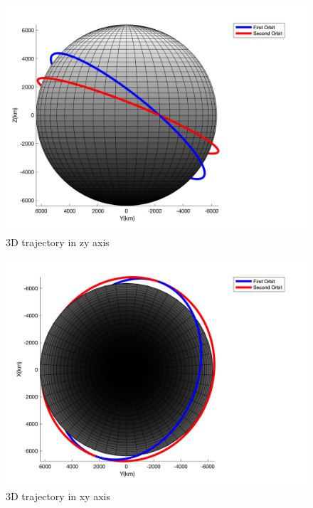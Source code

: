 \begin{figure}[H]
    \caption{3D trajectory in zy axis}
    \centering
    \includegraphics[width=16cm]{../Figure/Q2/yz_view_compare}
\end{figure}

\begin{figure}[H]
    \caption{3D trajectory in xy axis}
    \centering
    \includegraphics[width=16cm]{../Figure/Q2/xy_view_compare}
\end{figure}

